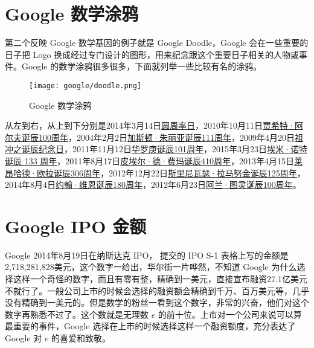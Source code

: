 \section{Google 数学涂鸦}
第二个反映 Google 数学基因的例子就是 Google Doodle，Google 会在一些重要的日子把 Logo 换成经过专门设计的图形，用来纪念跟这个重要日子相关的人物或事件。Google 的数学涂鸦很多很多，下面就列举一些比较有名的涂鸦。

\begin{figure}[htbp]
\centering
\texttt{[image: google/doodle.png]}
\caption{Google 数学涂鸦}
\centering
\end{figure}

从左到右，从上到下分别是2014年3月14日\href{http://www.google.com/doodles/pi-day?hl=zh-CN}{圆周率日}，2010年10月11日\href{http://www.google.com/doodles/cahit-arfs-100th-birthday?hl=zh-CN}{贾希特·阿尔夫诞辰100周年}，2004年2月2日\href{http://www.google.com/doodles/gaston-julias-111th-birthday?hl=zh-CN}{加斯顿·朱丽亚诞辰111周年}，2009年4月20日\href{http://www.google.com/doodles/zu-chongzhis-birthday?hl=zh-CN}{祖冲之诞辰纪念日}，2011年11月12日\href{http://www.google.com/doodles/hua-luogengs-101st-birthday?hl=zh-CN}{华罗庚诞辰101周年}，2015年3月23日\href{http://www.google.com/doodles/emmy-noethers-133rd-birthday?hl=zh-CN}{埃米·诺特诞辰 133 周年}，2011年8月17日\href{http://www.google.com/doodles/pierre-de-fermats-410th-birthday?hl=zh-CN}{皮埃尔·德·费玛诞辰410周年}，2013年4月15日\href{http://www.google.com/doodles/leonhard-eulers-306th-birthday?hl=zh-CN}{莱昂哈德·欧拉诞辰306周年}，2012年12月22日\href{http://www.google.com/doodles/srinivasa-ramanujans-125th-birthday?hl=zh-CN}{斯里尼瓦瑟·拉马努金诞辰125周年}，2014年8月4日\href{http://www.google.com/doodles/john-venns-180th-birthday?hl=zh-CN}{约翰·维恩诞辰180周年}，2012年6月23日\href{http://www.google.com/doodles/alan-turings-100th-birthday?hl=zh-CN}{阿兰·图灵诞辰100周年}。

\section{Google IPO 金额}
Google 2014年8月19日在纳斯达克 IPO， 提交的 IPO S-1 表格上写的金额是2,718,281,828美元，这个数字一给出，华尔街一片哗然，不知道 Google 为什么选择这样一个奇怪的数字，而且有零有整，精确到一美元，直接宣布融资27.1亿美元不就行了。一般公司上市的时候会选择的融资额会精确到千万、百万美元等，几乎没有精确到一美元的。但是数学的粉丝一看到这个数字，非常的兴奋，他们对这个数字再熟悉不过了。这个数就是无理数 $e$ 的前十位。上市对一个公司来说可以算最重要的事件，Google 选择在上市的时候选择这样一个融资额度，充分表达了 Google 对 $e$ 的喜爱和致敬。

